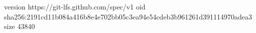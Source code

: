 version https://git-lfs.github.com/spec/v1
oid sha256:2191cd11b084a416b8e4e702bb05c3ea94e54cdeb3b961261d391114970adea3
size 43840
